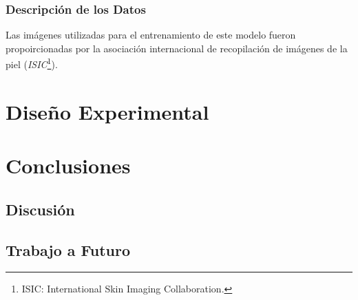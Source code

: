 \subsection{Descripción de los Datos}
Las imágenes utilizadas para el entrenamiento de este modelo fueron propoircionadas por la asociación internacional de recopilación de imágenes de la piel (\emph{ISIC}\footnote{ISIC: International Skin Imaging Collaboration.}).

\chapter{Diseño Experimental}

\chapter{Conclusiones}

\section{Discusión}

\section{Trabajo a Futuro}

\nocite{*}